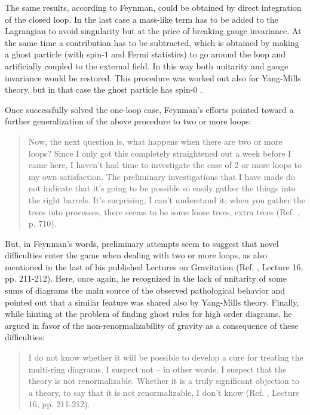 \documentclass{ws-procs961x669}            %
\begin{document}
The same results, according to Feynman, could be obtained by
direct integration of the closed loop. In the last case a
mass-like term has to be added to the Lagrangian to avoid
singularity but at the price of breaking gauge invariance. At the
same time a contribution has to be subtracted, which is obtained
by making a ghost particle (with spin-$1$ and Fermi statistics) to
go around the loop and artificially coupled to the external field.
In this way both unitarity and gauge invariance would be restored.
This procedure was worked out also for Yang-Mills theory, but in
that case the ghost particle has spin-$0$ \cite{WheelerFest2}.

Once successfully solved the one-loop case, Feynman's efforts
pointed toward a further generalization of the above procedure to
two or more loops:
\begin{quote}
Now, the next question is, what happens when there are two or more
loops? Since I only got this completely straightened out a week
before I came here, I haven't had time to investigate the case of
2 or more loops to my own satisfaction. The preliminary
investigations that I have made do not indicate that it's going to
be possible so easily gather the things into the right barrels.
It's surprising, I can't understand it; when you gather the trees
into processes, there seems to be some loose trees, extra trees
(Ref. , p. 710).
\end{quote}
But, in Feynman's words, preliminary attempts seem to suggest that
novel difficulties enter the game when dealing with two or more
loops, as also mentioned in the last of his published Lectures on
Gravitation (Ref. , Lecture 16, pp.
211-212). Here, once again, he recognized in the lack of unitarity
of some sums of diagrams the main source of the observed
pathological behavior and pointed out that a similar feature was
shared also by Yang-Mills theory. Finally, while hinting at the
problem of finding ghost rules for high order diagrams, he argued
in favor of the non-renormalizability of gravity as a consequence
of these difficulties:
\begin{quote}
I do not know whether it will be possible to develop a cure for
treating the multi-ring diagrams. I suspect not -- in other words,
I suspect that the theory is not renormalizable. Whether it is a
truly significant objection to a theory, to say that it is not
renormalizable, I don't know (Ref. ,
Lecture 16, pp. 211-212).
\end{quote}
\end{document}
